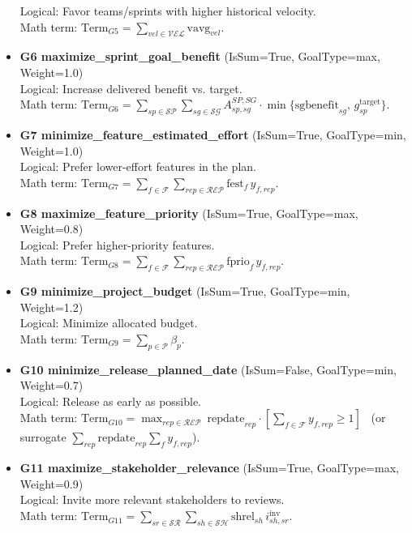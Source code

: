 \documentclass[a4paper,11pt]{article}
\begin{document}
\begin{itemize}[leftmargin=2.2em]
  Logical: Favor teams/sprints with higher historical velocity.\\
  Math term: $\displaystyle \text{Term}_{G5}=\sum_{vel\in\mathcal{VEL}} \text{vavg}_{vel}$.
  \item \textbf{G6 maximize\_sprint\_goal\_benefit} (IsSum=True, GoalType=max, Weight=1.0)\\
  Logical: Increase delivered benefit vs. target.\\
  Math term: $\displaystyle \text{Term}_{G6}=\sum_{sp\in\mathcal{SP}}\sum_{sg\in\mathcal{SG}} A^{SP,SG}_{sp,sg}\cdot \min\{\text{sgbenefit}_{sg},\, g^{\text{target}}_{sp}\}$.
  \item \textbf{G7 minimize\_feature\_estimated\_effort} (IsSum=True, GoalType=min, Weight=1.0)\\
  Logical: Prefer lower-effort features in the plan.\\
  Math term: $\displaystyle \text{Term}_{G7}=\sum_{f\in\mathcal{F}}\sum_{rep\in\mathcal{REP}} \text{fest}_f\, y_{f,rep}$.
  \item \textbf{G8 maximize\_feature\_priority} (IsSum=True, GoalType=max, Weight=0.8)\\
  Logical: Prefer higher-priority features.\\
  Math term: $\displaystyle \text{Term}_{G8}=\sum_{f\in\mathcal{F}}\sum_{rep\in\mathcal{REP}} \text{fprio}_f\, y_{f,rep}$.
  \item \textbf{G9 minimize\_project\_budget} (IsSum=True, GoalType=min, Weight=1.2)\\
  Logical: Minimize allocated budget.\\
  Math term: $\displaystyle \text{Term}_{G9}=\sum_{p\in\mathcal{P}} \beta_p$.
  \item \textbf{G10 minimize\_release\_planned\_date} (IsSum=False, GoalType=min, Weight=0.7)\\
  Logical: Release as early as possible.\\
  Math term: $\displaystyle \text{Term}_{G10}=\max_{rep\in\mathcal{REP}} \ \text{repdate}_{rep}\cdot \left[\sum_{f\in\mathcal{F}} y_{f,rep} \ge 1\right]$ \ (or surrogate $\sum_{rep}\text{repdate}_{rep}\sum_{f} y_{f,rep}$).
  \item \textbf{G11 maximize\_stakeholder\_relevance} (IsSum=True, GoalType=max, Weight=0.9)\\
  Logical: Invite more relevant stakeholders to reviews.\\
  Math term: $\displaystyle \text{Term}_{G11}=\sum_{sr\in\mathcal{SR}}\sum_{sh\in\mathcal{SH}} \text{shrel}_{sh}\, i^{\text{inv}}_{sh,sr}$.
\end{itemize}
\end{document}
